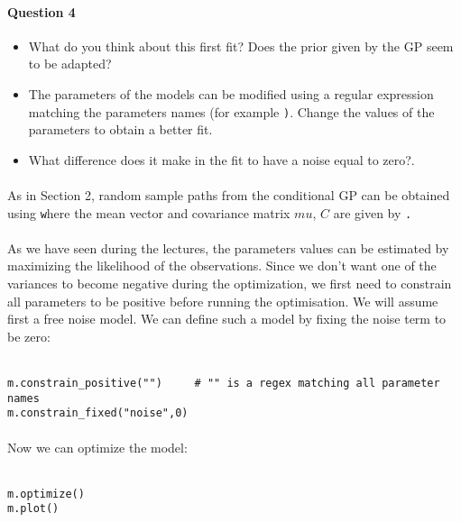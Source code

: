 \documentclass{article}
\newcommand{\mintinline}[1]{\colorbox{bg}{\lstinline[basicstyle=\ttfamily]{#1}}}
\begin{document}
\paragraph{Question 4}
\begin{itemize}
 \item[$\star$] What do you think about this first fit? Does the prior given by the GP seem to be adapted?
 \item[$\star$] The parameters of the models can be modified using a regular expression matching the parameters names (for example \texttt). Change the values of the parameters to obtain a better fit.
 \item[$\star$] What difference does it make in the fit to have a noise equal to zero?.
\end{itemize}

\paragraph{}
As in Section 2, random sample paths from the conditional GP can be obtained using \texttt where the mean vector and covariance matrix $mu$, $C$ are given by \texttt.

\paragraph{}
As we have seen during the lectures, the parameters values can be estimated by
maximizing the likelihood of the observations. Since we don't want one of the
variances to become negative during the optimization, we first need to constrain
all parameters to be positive before running the optimisation. We will assume first a free
noise model. We can define such a model by fixing the noise term to be zero:\\ \ \\
\begin{verbatim}
m.constrain_positive("")     # "" is a regex matching all parameter names
m.constrain_fixed("noise",0)
\end{verbatim}

\paragraph{}
Now we can optimize the model:\\ \ \\
\begin{verbatim}
m.optimize()
m.plot()
\end{verbatim}
\end{document}
